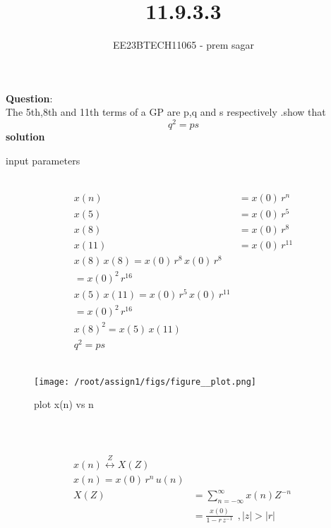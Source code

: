 \documentclass[journal,12pt,twocolumn]{IEEEtran}
\theoremstyle{remark}
\begin{document}

\vspace{3cm}

\title{11.9.3.3}
\author{EE23BTECH11065 - prem sagar}
\maketitle
\newpage

\bigskip 

\renewcommand{\thefigure}{\theenumi}
\renewcommand{\thetable}{\theenumi}
\textbf{Question}:\\ The 5th,8th and 11th terms of a GP are p,q and s respectively .show that \[q^2=ps\]
\textbf{solution}
\begin{table}[!ht]
   \centering
      
    \caption{input parameters}
    \label{tab:11.9.3}
 \end{table}
\\\begin{align}
x(n)&= x(0)\,r^{n}
\\x(5)&=x(0)\,r^5
\\x(8)&=x(0)\,r^8
\\x({11})&=x(0)\,r^{11}
\\x(8)\,x(8)=x(0)\,r^8\,x(0)\,r^8
     \\ =x(0)^2\,r^{16}
\\x(5)\,x({11})=x(0)\,r^5\,x(0)\,r^{11}
       \\=x(0)^2\,r^{16}
\\x(8)^2=x(5)\,x({11})
\\q^2=ps
\end{align} 
\\\begin{figure}
    \centering
    \texttt{[image: /root/assign1/figs/figure\_\_plot.png]}
    \caption{plot x(n) vs n}
    \label{fig:enter-label}
\end{figure}\\
\\\begin{align}
\\x(n)\overset{Z}{\longleftrightarrow}   X(Z)
\\x(n)=x(0)\,r^n\,u(n)
\\X(Z)&=\sum_{n=-\infty}^{\infty}x(n) Z^{-n}\
     \\ &= \frac{x(0)}{1-r\,z^{-1}}\: \:,|z|>|r| \end{align}   
\end{document}
